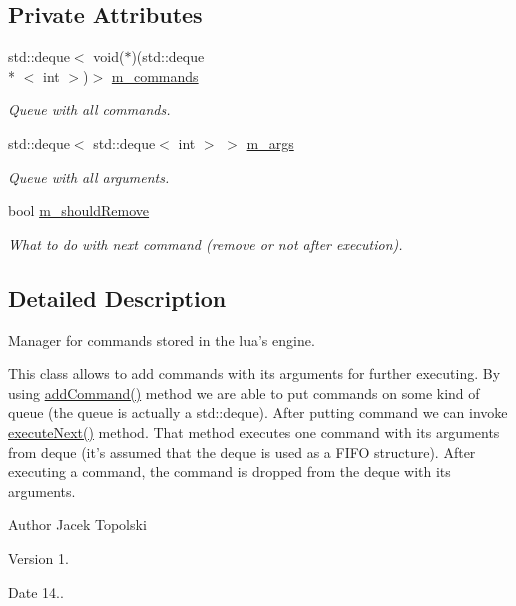 \subsection*{Private Attributes}
\begin{DoxyCompactItemize}
\item 
std\-::deque$<$ void($\ast$)(std\-::deque\\*
$<$ int $>$)$>$ \hyperlink{class_commands_manager_a99e904afc8d341f390efbd2c933c3321}{m\-\_\-commands}
\begin{DoxyCompactList}\small\item\em Queue with all commands. \end{DoxyCompactList}\item 
std\-::deque$<$ std\-::deque$<$ int $>$ $>$ \hyperlink{class_commands_manager_a47bce7001c94f824eb8b9acdccd7b1d5}{m\-\_\-args}
\begin{DoxyCompactList}\small\item\em Queue with all arguments. \end{DoxyCompactList}\item 
bool \hyperlink{class_commands_manager_a0732a178dc1347026f7df12b76a0d8de}{m\-\_\-should\-Remove}
\begin{DoxyCompactList}\small\item\em What to do with next command (remove or not after execution). \end{DoxyCompactList}\end{DoxyCompactItemize}


\subsection{Detailed Description}
Manager for commands stored in the lua's engine. 

This class allows to add commands with its arguments for further executing. By using \hyperlink{class_commands_manager_a1044e5df37dbb2b174dc9bc6a894d833}{add\-Command()} method we are able to put commands on some kind of queue (the queue is actually a std\-::deque). After putting command we can invoke \hyperlink{class_commands_manager_a6de7776ecdf30cb6cf09d11213c0dd29}{execute\-Next()} method. That method executes one command with its arguments from deque (it's assumed that the deque is used as a F\-I\-F\-O structure). After executing a command, the command is dropped from the deque with its arguments. \begin{DoxyAuthor}{Author}
Jacek Topolski 
\end{DoxyAuthor}
\begin{DoxyVersion}{Version}
1. 
\end{DoxyVersion}
\begin{DoxyDate}{Date}
14.. 
\end{DoxyDate}


